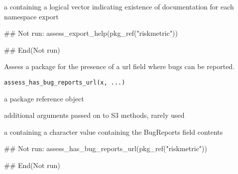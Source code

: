 \documentclass[a4paper]{book}
\begin{document}
%
\begin{Value}
a  containing a logical vector indicating existence of documentation for each namespace export
\end{Value}
%
\begin{SeeAlso}
\end{SeeAlso}
%
\begin{Examples}
\begin{ExampleCode}
## Not run: 
assess_export_help(pkg_ref("riskmetric"))

## End(Not run)
\end{ExampleCode}
\end{Examples}
%
\begin{Description}
Assess a package for the presence of a url field where bugs can be reported.
\end{Description}
%
\begin{Usage}
\begin{verbatim}
assess_has_bug_reports_url(x, ...)
\end{verbatim}
\end{Usage}
%
\begin{Arguments}
\begin{ldescription}
\item[\code{x}] a  package reference object

\item[\code{...}] additional arguments passed on to S3 methods, rarely used
\end{ldescription}
\end{Arguments}
%
\begin{Value}
a  containing a character value containing the BugReports field contents
\end{Value}
%
\begin{SeeAlso}
\end{SeeAlso}
%
\begin{Examples}
\begin{ExampleCode}
## Not run: 
assess_has_bug_reports_url(pkg_ref("riskmetric"))

## End(Not run)
\end{ExampleCode}
\end{Examples}
\end{document}
